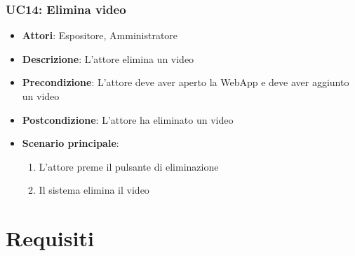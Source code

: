 \subsubsection{UC14: Elimina video}
\label{subsubsec:uc14}
\begin{itemize}
    \item \textbf{Attori}: Espositore, Amministratore
    \item \textbf{Descrizione}: L'attore elimina un video
    \item \textbf{Precondizione}: L'attore deve aver aperto la WebApp e deve aver aggiunto un video
    \item \textbf{Postcondizione}: L'attore ha eliminato un video
    \item \textbf{Scenario principale}:
    \begin{enumerate}
        \item L'attore preme il pulsante di eliminazione
        \item Il sistema elimina il video
    \end{enumerate}
\end{itemize}

\section{Requisiti}
\label{sec:requisiti}
